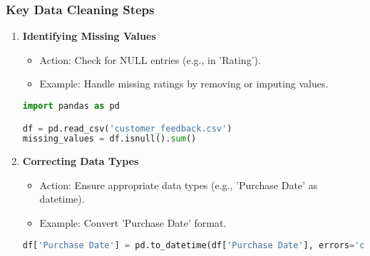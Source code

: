 \documentclass[aspectratio=169]{beamer}
\begin{document}
\begin{frame}[fragile]
    \frametitle{Key Data Cleaning Steps}
    \begin{enumerate}
        \item \textbf{Identifying Missing Values}
            \begin{itemize}
                \item Action: Check for NULL entries (e.g., in 'Rating').
                \item Example: Handle missing ratings by removing or imputing values.
            \end{itemize}
            \begin{lstlisting}[language=Python]
import pandas as pd

df = pd.read_csv('customer_feedback.csv')
missing_values = df.isnull().sum()
            \end{lstlisting}

        \item \textbf{Correcting Data Types}
            \begin{itemize}
                \item Action: Ensure appropriate data types (e.g., 'Purchase Date' as datetime).
                \item Example: Convert 'Purchase Date' format.
            \end{itemize}
            \begin{lstlisting}[language=Python]
df['Purchase Date'] = pd.to_datetime(df['Purchase Date'], errors='coerce')
            \end{lstlisting}
    \end{enumerate}
\end{frame}
\end{document}

